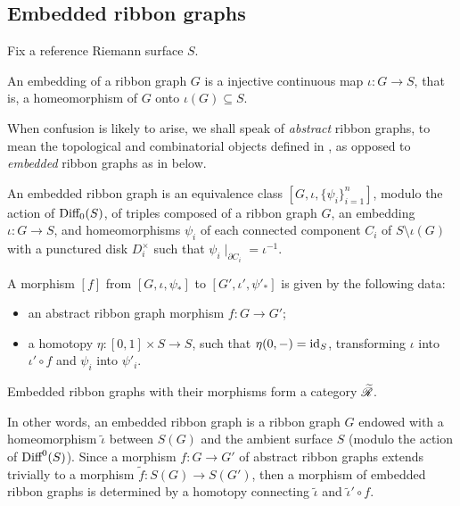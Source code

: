 \subsection{Embedded ribbon graphs}
\label{sec:embedded-rg}

Fix a reference Riemann surface $S$.

An embedding of a ribbon graph $G$ is a injective continuous map $\iota:G\to
S$, that is, a homeomorphism of $G$ onto $\iota(G) \subseteq S$.

When confusion is likely to arise, we shall speak of \emph{abstract}
ribbon graphs, to mean the topological and combinatorial objects
defined in , as opposed to \emph{embedded}
ribbon graphs as in  below.

\begin{definition}\label{dfn:embedded-rg}
  An embedded ribbon graph is an equivalence class $[G, \iota,
  \{\psi_i\}_{i=1}^n]$, modulo the action of $\textrm{Diff}_0(S)$, of triples
  composed of a ribbon graph $G$, an embedding $\iota:G\to S$, and
  homeomorphisms $\psi_i$ of each connected component $C_i$ of $S \setminus \iota(G)$
  with a punctured disk $D_i^\times$ such that $\psi_i\mid_{\partial C_i} = \iota^{-1}$.

  A morphism $[f]$ from $[G, \iota, \psi_*]$ to $[G', \iota', \psi'_*]$ is given by
  the following data:
  \begin{itemize}
  \item an abstract ribbon graph morphism $f:G\to G'$;
  \item a homotopy $\eta:[0,1] \times S\to S$, such that $\eta(0,-) = \operatorname{id}_S$,
    transforming $\iota$ into $\iota' \circ f$ and $\psi_i$ into $\psi'_i$.%
  \end{itemize}

  Embedded ribbon graphs with their morphisms form a category $\mathscr{\widetilde R}_{}$.
\end{definition}
In other words, an embedded ribbon graph is a ribbon graph $G$ endowed
with a homeomorphism ${\tilde \iota}$ between $S(G)$ and the ambient
surface $S$ (modulo the action of $\textrm{Diff}^0(S)$).%
Since a morphism $f:G\to G'$ of abstract ribbon graphs extends trivially
to a morphism ${\tilde f}:S(G)\to S(G')$, then a morphism of embedded
ribbon graphs is determined by a homotopy connecting ${\tilde \iota}$ and
${\tilde \iota' \circ f}$.

